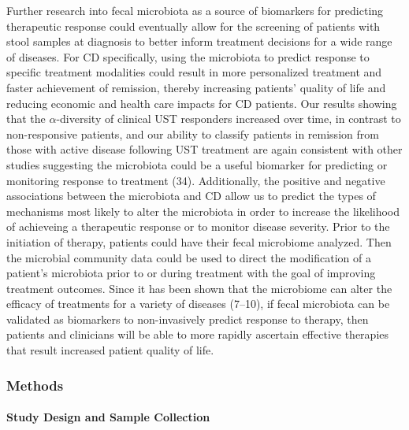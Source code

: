 \documentclass[12pt,]{article}
\let\oldparagraph\paragraph
\renewcommand{\paragraph}[1]{\oldparagraph{#1}\mbox{}}
\begin{document}
Further research into fecal microbiota as a source of biomarkers for
predicting therapeutic response could eventually allow for the screening
of patients with stool samples at diagnosis to better inform treatment
decisions for a wide range of diseases. For CD specifically, using the
microbiota to predict response to specific treatment modalities could
result in more personalized treatment and faster achievement of
remission, thereby increasing patients' quality of life and reducing
economic and health care impacts for CD patients. Our results showing
that the \({\alpha}\)-diversity of clinical UST responders increased
over time, in contrast to non-responsive patients, and our ability to
classify patients in remission from those with active disease following
UST treatment are again consistent with other studies suggesting the
microbiota could be a useful biomarker for predicting or monitoring
response to treatment (34). Additionally, the positive and negative
associations between the microbiota and CD allow us to predict the types
of mechanisms most likely to alter the microbiota in order to increase
the likelihood of achieveing a therapeutic response or to monitor
disease severity. Prior to the initiation of therapy, patients could
have their fecal microbiome analyzed. Then the microbial community data
could be used to direct the modification of a patient's microbiota prior
to or during treatment with the goal of improving treatment outcomes.
Since it has been shown that the microbiome can alter the efficacy of
treatments for a variety of diseases (7--10), if fecal microbiota can be
validated as biomarkers to non-invasively predict response to therapy,
then patients and clinicians will be able to more rapidly ascertain
effective therapies that result increased patient quality of life.

\newpage

\subsubsection{Methods}\label{methods}

\paragraph{Study Design and Sample
Collection}\label{study-design-and-sample-collection}
\end{document}
